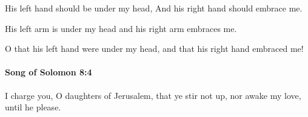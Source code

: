 			\begin{versebox}
					\item[BHS] 
					\item[LXX] 
					\item[ASV] His left hand should be under my head, And his right hand should embrace me.
					\item[NIV] His left arm is under my head and his right arm embraces me.
					\item[NRSV] O that his left hand were under my head, and that his right hand embraced me!
			\end{versebox}

		\paragraph{Song of Solomon 8:4} %
			\label{SONGOFSOLOMON-8-4}

			I charge you, O daughters of Jerusalem, that ye stir not up, nor awake my love, until he please.

